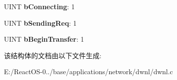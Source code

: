 \begin{DoxyCompactItemize}
\mbox{\label{struct_c_bind_status_callback_a5fd90b56c52963b399fbc98bdd63b0fb}} 
U\+I\+NT {\bfseries b\+Connecting}\+: 1
\item 
\mbox{\label{struct_c_bind_status_callback_a4fe1b77a9512e27c0d751e9140145806}} 
U\+I\+NT {\bfseries b\+Sending\+Req}\+: 1
\item 
\mbox{\label{struct_c_bind_status_callback_a7841a52e0fda1ebee2d4f81702a18185}} 
U\+I\+NT {\bfseries b\+Begin\+Transfer}\+: 1
\end{DoxyCompactItemize}


该结构体的文档由以下文件生成\+:\begin{DoxyCompactItemize}
\item 
E\+:/\+React\+O\+S-\/0../base/applications/network/dwnl/dwnl.\+c\end{DoxyCompactItemize}
